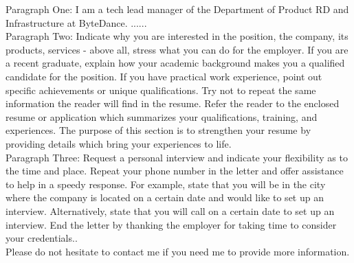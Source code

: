 Paragraph One: I am a tech lead manager of the Department of Product RD and Infrastructure at ByteDance.  ......\\

Paragraph Two: Indicate why you are interested in the position, the company, its products, services - above all, stress 
what you can do for the employer. If you are a recent graduate, explain how your academic background makes you a qualified 
candidate for the position. If you have practical work experience, point out specific achievements or unique qualifications. 
Try not to repeat the same information the reader will find in the resume. Refer the reader to the enclosed resume or application 
which summarizes your qualifications, training, and experiences. The purpose of this section is to strengthen your resume by 
providing details which bring your experiences to life. \\
 
Paragraph Three: Request a personal interview and indicate your flexibility as to the time and place. Repeat your phone number 
in the letter and offer assistance to help in a speedy response. For example, state that you will be in the city where the company 
is located on a certain date and would like to set up an interview. Alternatively, state that you will call on a certain date to set 
up an interview. End the letter by thanking the employer for taking time to consider your credentials.. \\

Please do not hesitate to contact me if you need me to provide more information.